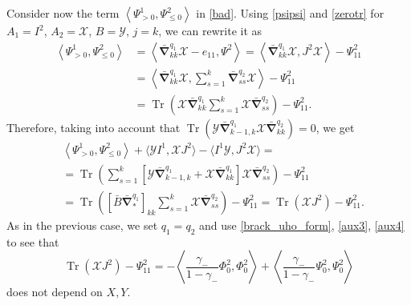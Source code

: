 \documentclass{amsart}
\theoremstyle{definition}
\theoremstyle{remark}
\numberwithin{equation}{section}
\numberwithin{theorem}{section}
\begin{document}
Consider now the term $\left \langle 
\Psi^1_{>0}, \Psi^2_{\leq 0} \right \rangle$ in \eqref{bad}. Using \eqref{psipsi}
and \eqref{zerotr} for $A_1=I^2$, $A_2={{\mathcal X}}$, $B={{\mathcal Y}}$, $j=k$, we can rewrite it as 
\begin{equation*}
\begin{aligned}
\left \langle 
\Psi^1_{>0}, \Psi^2_{\leq 0} \right \rangle & = \left \langle 
\bar{\boldsymbol\nabla}^{q_1}_{kk}{{\mathcal X}} - e_{11}, \Psi^2 \right \rangle= \left \langle
\bar{\boldsymbol\nabla}^{q_1}_{kk}{{\mathcal X}} , J^2{{\mathcal X}} \right \rangle -{\Psi}^2_{11} \\
&= \left \langle \bar{\boldsymbol\nabla}^{q_1}_{kk}{{\mathcal X}}, \sum_{s=1}^{k} 
\bar{\boldsymbol\nabla}_{ss}^{q_2}{{\mathcal X}} 
\right \rangle -{\Psi}^2_{11}
 \\
&={\operatorname{Tr}}\left ( {{\mathcal X}}\bar{\boldsymbol\nabla}^{q_1}_{kk}
\sum_{s=1}^{k} {{\mathcal X}} \bar{\boldsymbol\nabla}_{ss}^{q_2} \right )-{\Psi}^2_{11}.
\end{aligned}
\end{equation*}
Therefore, taking into account that ${\operatorname{Tr}} ({{\mathcal Y}}\bar{\boldsymbol\nabla}_{k-1,k}^{q_1} {{\mathcal X}} \bar{\boldsymbol\nabla}_{kk}^{q_2})=0$,
we get
\begin{equation*}
\begin{aligned}
&\left \langle 
\Psi^1_{>0}, \Psi^2_{\leq 0} \right \rangle + \langle {{\mathcal Y}} I^1,{{\mathcal X}} J^2\rangle  -
\langle I^1{{\mathcal Y}}, J^2{{\mathcal X}}\rangle    =
\\
&
= {\operatorname{Tr}}\left(
\sum_{s=1}^{k}\left [ {{\mathcal Y}}\bar{\boldsymbol\nabla}_{k-1,k}^{q_1} + {{\mathcal X}}\bar{\boldsymbol\nabla}^{q_1}_{kk}
\right ] {{\mathcal X}} \bar{\boldsymbol\nabla}_{ss}^{q_2}\right )-{\Psi}^2_{11}
\\
&
={\operatorname{Tr}} \left ([\bar B\bar {\boldsymbol\nabla}^{q_1}_*]_{kk} 
 \sum_{s=1}^{k} {{\mathcal X}} \bar{\boldsymbol\nabla}_{ss}^{q_2}\right )-{\Psi}^2_{11}
={\operatorname{Tr}}({{\mathcal X}} J^2) - {\Psi}^2_{11}.
\end{aligned}
\end{equation*}
As in the previous case, we set $q_1=q_2$ and use 
 \eqref{brack_uho_form}, \eqref{aux3}, \eqref{aux4} to see that
\begin{equation}
\label{bad2}
{\operatorname{Tr}}({{\mathcal X}} J^2) - {\Psi}^2_{11} = - \left \langle \frac{\gamma_-}{1-\gamma_-}{\Phi}^2_{0}, {\Phi}^2_{0} \right \rangle
+ \left \langle \frac{\gamma_-}{1-\gamma_-}{\Psi}^2_{0}, {\Psi}^2_{0} \right \rangle 
\end{equation}
does not depend on $X, Y$.
\end{document}
